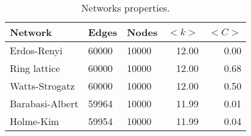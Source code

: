 \begin{table}
\centering
\caption{Networks properties.}
\label{tab:networks}
\begin{tabular}{lllrr}
\toprule
         Network &  Edges &  Nodes & $<k>$ & $<C>$ \\
\midrule
     Erdos-Renyi &  60000 &  10000 & 12.00 &  0.00 \\
    Ring lattice &  60000 &  10000 & 12.00 &  0.68 \\
  Watts-Strogatz &  60000 &  10000 & 12.00 &  0.50 \\
 Barabasi-Albert &  59964 &  10000 & 11.99 &  0.01 \\
       Holme-Kim &  59954 &  10000 & 11.99 &  0.04 \\
\bottomrule
\end{tabular}
\end{table}
